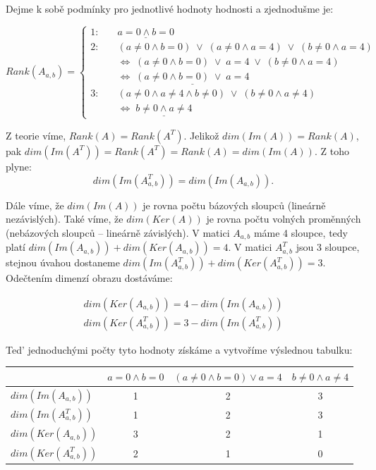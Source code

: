 \documentclass[12pt]{article}
\begin{document}
\begin{enumerate}
\begin{enumerate}
    \end{enumerate}
 
        Dejme k sobě podmínky pro jednotlivé hodnoty hodnosti a zjednodušme je:

        \[Rank(A_{a,b}) = \begin{cases}
          1: \quad &\underline{a=0 \land b=0 }\\
          2: \quad &(a\neq0 \land b=0) \;\lor\; (a\neq0 \land a=4) \;\lor\; (b\neq0 \land a=4) \\
                  &\Leftrightarrow \; (a\neq0 \land b=0) \;\lor\; a=4 \;\lor\; (b\neq0 \land a=4) \\
                  &\Leftrightarrow \; \underline{(a\neq0 \land b=0) \;\lor\; a=4 }\\
          3: \quad &(a\neq0 \land a\neq4 \land b\neq0) \;\lor\; (b\neq0 \land a\neq4) \\
                  &\Leftrightarrow \; \underline{b\neq0 \land a\neq4}
        \end{cases}\]

        Z teorie víme, $Rank(A)=Rank(A^T)$. Jelikož $dim(Im(A))=Rank(A)$, pak $dim(Im(A^T))=Rank(A^T)=Rank(A)=dim(Im(A))$.
        Z toho plyne:
        \[dim(Im(A_{a,b}^T)) = dim(Im(A_{a,b})).\]
        
        Dále víme, že $dim(Im(A))$ je rovna počtu bázových sloupců (lineárně nezávislých).
        Také víme, že $dim(Ker(A))$ je rovna počtu volných proměnných (nebázových sloupců -- lineárně závislých).
        V matici $A_{a,b}$ máme 4 sloupce, tedy platí $dim(Im(A_{a,b})) + dim(Ker(A_{a,b})) = 4$.
        V matici $A_{a,b}^T$ jsou 3 sloupce, stejnou úvahou dostaneme $dim(Im(A_{a,b}^T)) + dim(Ker(A_{a,b}^T)) = 3$.
        Odečtením dimenzí obrazu dostáváme:

        \begin{align*}
           dim(Ker(A_{a,b})) = 4 - dim(Im(A_{a,b})) \\
           dim(Ker(A_{a,b}^T)) = 3 - dim(Im(A_{a,b}^T))
        \end{align*}

        Ted' jednoduchými počty tyto hodnoty získáme a vytvoříme výslednou tabulku:


        \begin{table}[h]
          \centering
          \begin{tabular}{lccc}
            \toprule
            & $a=0 \land b=0$ & \;\;$(a\neq0 \land b=0) \lor a=4$\;\; & $b\neq0 \land a\neq4$ \\ 
            \midrule
            $dim(Im(A_{a,b}))$ & 1 & 2 & 3 \\
            $dim(Im(A_{a,b}^T))$ & 1 & 2 & 3 \\
            $dim(Ker(A_{a,b}))$ & 3 & 2 & 1 \\
            $dim(Ker(A_{a,b}^T))$ & 2 & 1 & 0 \\
            \bottomrule
          \end{tabular}
        \end{table}
      

\end{enumerate}
\end{document}
